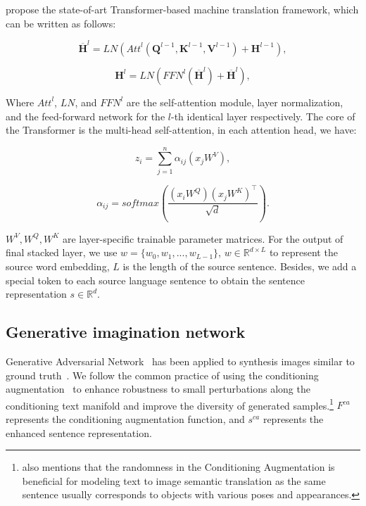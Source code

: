 \documentclass[11pt]{article}
\begin{document}
\citet{vaswani2017attention} propose the state-of-art Transformer-based machine translation framework, which can be written as follows:

\begin{equation}
    \overline{\textbf{H}}^{l}=\textit{LN}(\textit{Att}^{l}(\textbf{Q}^{l-1},\textbf{K}^{l-1},\textbf{V}^{l-1})+\textbf{H}^{l-1}),
\end{equation}

\begin{equation}
    \textbf{H}^{l}=\textit{LN}(\textit{FFN}^{l}(\overline{\textbf{H}}^{l})+\overline{\textbf{H}}^{l}),
\end{equation}

Where $\textit{Att}^{l}$, $\textit{LN}$, and $\textit{FFN}^{l}$ are the self-attention module, layer normalization, and the feed-forward network for the $l$-th identical layer respectively. The core of the Transformer is the multi-head self-attention, in each attention head, we have:

\begin{equation}
    z_{i}=\sum_{j=1}^{n}\alpha_{ij}(x_{j}W^{V}),
\end{equation}

\begin{equation}
    \alpha_{ij}=softmax(\frac{(x_{i}W^{Q})(x_{j}W^{K})^\top }{\sqrt{d}}).
\end{equation}

$W^{V},W^{Q},W^{K}$ are layer-specific trainable parameter matrices. For the output of final stacked layer, we use $w=\{w_{0},w_{1},...,w_{L-1} \}$, $w\in\mathbb{R}^{d\times L}$ to represent the source word embedding, $L$ is the length of the source sentence. Besides, we add a special token to each source language sentence to obtain the sentence representation $s \in \mathbb{R}^{d}$.

\subsection{Generative imagination network}

Generative Adversarial Network~\cite{goodfellow2014generative} has been applied to synthesis images similar to ground truth~\cite{zhang2017stackgan,xu2018attngan,qiao2019mirrorgan}. We follow the common practice of using the conditioning augmentation~\cite{zhang2017stackgan} to enhance robustness to small perturbations along the conditioning text manifold and improve the diversity of generated samples.\footnote{\citet{zhang2017stackgan} also mentions that the randomness in the Conditioning Augmentation is beneficial for modeling text to image semantic translation as the same sentence usually corresponds to objects with various poses and appearances.} $F^{ca}$ represents the conditioning augmentation function, and $s^{ca}$ represents the enhanced sentence representation.
\end{document}

